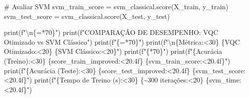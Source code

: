 \documentclass[
  brazilian,
]{report}
\newenvironment{Shaded}{\begin{snugshade}}{\end{snugshade}}
\newcommand{\BuiltInTok}[1]{\textcolor[rgb]{0.00,0.23,0.31}{#1}}
\newcommand{\CharTok}[1]{\textcolor[rgb]{0.13,0.47,0.30}{#1}}
\newcommand{\CommentTok}[1]{\textcolor[rgb]{0.37,0.37,0.37}{#1}}
\newcommand{\DecValTok}[1]{\textcolor[rgb]{0.68,0.00,0.00}{#1}}
\newcommand{\NormalTok}[1]{\textcolor[rgb]{0.00,0.23,0.31}{#1}}
\newcommand{\OperatorTok}[1]{\textcolor[rgb]{0.37,0.37,0.37}{#1}}
\newcommand{\SpecialCharTok}[1]{\textcolor[rgb]{0.37,0.37,0.37}{#1}}
\newcommand{\SpecialStringTok}[1]{\textcolor[rgb]{0.13,0.47,0.30}{#1}}
\newcommand{\StringTok}[1]{\textcolor[rgb]{0.13,0.47,0.30}{#1}}
\begin{document}
\begin{tcolorbox}
\begin{Shaded}
\begin{Highlighting}[]
\CommentTok{\# Avaliar SVM}
\NormalTok{svm\_train\_score }\OperatorTok{=}\NormalTok{ svm\_classical.score(X\_train, y\_train)}
\NormalTok{svm\_test\_score }\OperatorTok{=}\NormalTok{ svm\_classical.score(X\_test, y\_test)}

\BuiltInTok{print}\NormalTok{(}\SpecialStringTok{f"}\CharTok{\textbackslash{}n}\SpecialCharTok{\{}\StringTok{\textquotesingle{}=\textquotesingle{}}\OperatorTok{*}\DecValTok{70}\SpecialCharTok{\}}\SpecialStringTok{"}\NormalTok{)}
\BuiltInTok{print}\NormalTok{(}\SpecialStringTok{f"COMPARAÇÃO DE DESEMPENHO: VQC Otimizado vs SVM Clássico"}\NormalTok{)}
\BuiltInTok{print}\NormalTok{(}\SpecialStringTok{f"}\SpecialCharTok{\{}\StringTok{\textquotesingle{}=\textquotesingle{}}\OperatorTok{*}\DecValTok{70}\SpecialCharTok{\}}\SpecialStringTok{"}\NormalTok{)}
\BuiltInTok{print}\NormalTok{(}\SpecialStringTok{f"}\CharTok{\textbackslash{}n}\SpecialCharTok{\{}\StringTok{\textquotesingle{}Métrica\textquotesingle{}}\SpecialCharTok{:\textless{}30\}}\SpecialStringTok{ }\SpecialCharTok{\{}\StringTok{\textquotesingle{}VQC Otimizado\textquotesingle{}}\SpecialCharTok{:\textless{}20\}}\SpecialStringTok{ }\SpecialCharTok{\{}\StringTok{\textquotesingle{}SVM Clássico\textquotesingle{}}\SpecialCharTok{:\textless{}20\}}\SpecialStringTok{"}\NormalTok{)}
\BuiltInTok{print}\NormalTok{(}\SpecialStringTok{f"}\SpecialCharTok{\{}\StringTok{\textquotesingle{}{-}\textquotesingle{}}\OperatorTok{*}\DecValTok{70}\SpecialCharTok{\}}\SpecialStringTok{"}\NormalTok{)}
\BuiltInTok{print}\NormalTok{(}\SpecialStringTok{f"}\SpecialCharTok{\{}\StringTok{\textquotesingle{}Acurácia (Treino)\textquotesingle{}}\SpecialCharTok{:\textless{}30\}}\SpecialStringTok{ }\SpecialCharTok{\{}\NormalTok{score\_train\_improved}\SpecialCharTok{:\textless{}20.4f\}}\SpecialStringTok{ }\SpecialCharTok{\{}\NormalTok{svm\_train\_score}\SpecialCharTok{:\textless{}20.4f\}}\SpecialStringTok{"}\NormalTok{)}
\BuiltInTok{print}\NormalTok{(}\SpecialStringTok{f"}\SpecialCharTok{\{}\StringTok{\textquotesingle{}Acurácia (Teste)\textquotesingle{}}\SpecialCharTok{:\textless{}30\}}\SpecialStringTok{ }\SpecialCharTok{\{}\NormalTok{score\_test\_improved}\SpecialCharTok{:\textless{}20.4f\}}\SpecialStringTok{ }\SpecialCharTok{\{}\NormalTok{svm\_test\_score}\SpecialCharTok{:\textless{}20.4f\}}\SpecialStringTok{"}\NormalTok{)}
\BuiltInTok{print}\NormalTok{(}\SpecialStringTok{f"}\SpecialCharTok{\{}\StringTok{\textquotesingle{}Tempo de Treino (s)\textquotesingle{}}\SpecialCharTok{:\textless{}30\}}\SpecialStringTok{ }\SpecialCharTok{\{}\StringTok{\textquotesingle{}\textasciitilde{}300 iterações\textquotesingle{}}\SpecialCharTok{:\textless{}20\}}\SpecialStringTok{ }\SpecialCharTok{\{}\NormalTok{svm\_time}\SpecialCharTok{:\textless{}20.4f\}}\SpecialStringTok{"}\NormalTok{)}

\end{Highlighting}
\end{Shaded}
\end{tcolorbox}
\end{document}
